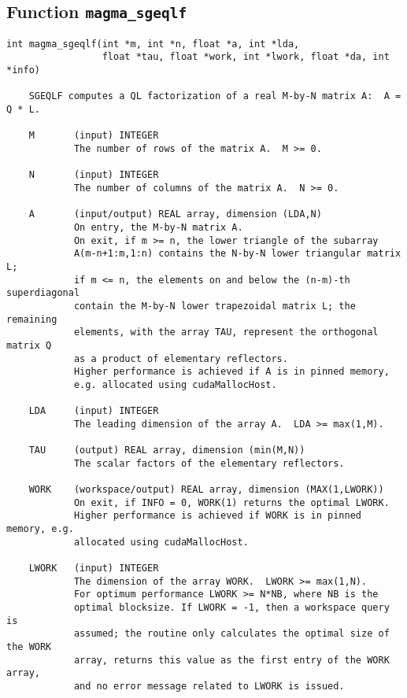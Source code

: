 \documentclass[10pt]{book}
\begin{document}
\newpage
\subsection{Function {\tt {\bf magma\_sgeqlf}}}
\begin{verbatim}
int magma_sgeqlf(int *m, int *n, float *a, int *lda,
                 float *tau, float *work, int *lwork, float *da, int *info)

    SGEQLF computes a QL factorization of a real M-by-N matrix A:  A = Q * L.

    M       (input) INTEGER
            The number of rows of the matrix A.  M >= 0.

    N       (input) INTEGER
            The number of columns of the matrix A.  N >= 0.

    A       (input/output) REAL array, dimension (LDA,N)
            On entry, the M-by-N matrix A.
            On exit, if m >= n, the lower triangle of the subarray
            A(m-n+1:m,1:n) contains the N-by-N lower triangular matrix L;
            if m <= n, the elements on and below the (n-m)-th superdiagonal 
            contain the M-by-N lower trapezoidal matrix L; the remaining 
            elements, with the array TAU, represent the orthogonal matrix Q 
            as a product of elementary reflectors. 
            Higher performance is achieved if A is in pinned memory, 
            e.g. allocated using cudaMallocHost.

    LDA     (input) INTEGER
            The leading dimension of the array A.  LDA >= max(1,M).

    TAU     (output) REAL array, dimension (min(M,N))
            The scalar factors of the elementary reflectors.

    WORK    (workspace/output) REAL array, dimension (MAX(1,LWORK))
            On exit, if INFO = 0, WORK(1) returns the optimal LWORK.
            Higher performance is achieved if WORK is in pinned memory, e.g.
            allocated using cudaMallocHost.

    LWORK   (input) INTEGER
            The dimension of the array WORK.  LWORK >= max(1,N).
            For optimum performance LWORK >= N*NB, where NB is the
            optimal blocksize. If LWORK = -1, then a workspace query is 
            assumed; the routine only calculates the optimal size of the WORK 
            array, returns this value as the first entry of the WORK array, 
            and no error message related to LWORK is issued.


\end{verbatim}
\end{document}
